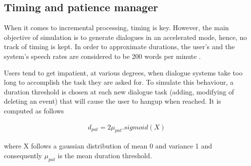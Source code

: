     \subsection{Timing and patience manager}
    
    	When it comes to incremental processing, timing is key. However, the main objective of simulation is to generate dialogues in an accelerated mode, hence, no track of timing is kept. In order to approximate durations, the user's and the system's speech rates are considered to be 200 words per minute \cite{Yuan2006}.
        
        Users tend to get impatient, at various degrees, when dialogue systems take too long to accomplish the task they are asked for. To simulate this behaviour, a duration threshold is chosen at each new dialogue task (adding, modifying of deleting an event) that will cause the user to hangup when reached. It is computed as follows
        
       	\begin{eqnarray}
        	d_{pat} = 2 \mu_{pat}.sigmoid(X)
        \end{eqnarray}
        
        where X follows a gaussian distribution of mean 0 and variance 1 and consequently $\mu_{pat}$ is the mean duration threshold.
    
